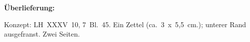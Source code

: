 %  
%
%
%
%   
%
%
%
%
%
%
%
\frenchspacing
%
\begin{ledgroupsized}[r]{120mm}
\footnotesize
\pstart
\noindent\textbf{Überlieferung:}
\pend
\end{ledgroupsized}
%
\begin{ledgroupsized}[r]{114mm}
\footnotesize
\pstart \parindent -6mm
%
Konzept:
LH~XXXV~10, 7~Bl.~45.
Ein Zettel (ca.~3~x~5,5~cm.);
unterer Rand ausgefranst.
Zwei Seiten.
\pend
\end{ledgroupsized}
%
%
\vspace{5mm}
